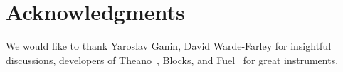 \documentclass{article}
\begin{document}
\section*{Acknowledgments}

We would like to thank Yaroslav Ganin, David Warde-Farley for insightful discussions,
developers of Theano~\cite{2016arXiv160502688short}, Blocks, and Fuel~\cite{MerrienboerBDSW15} 
for great instruments.

%


\end{document}
